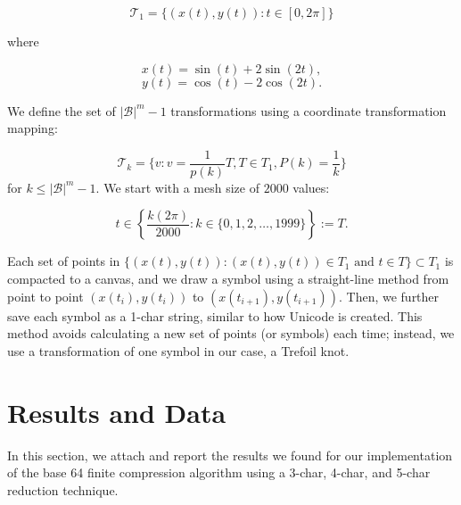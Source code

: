 \documentclass[amsmath,12pt,a4paper]{amsart}
\begin{document}
\begin{center}

\end{center}

$$
\mathcal{T}_1 = \{ (x(t), y(t)) : t \in [0, 2\pi] \}
$$

where

\[
x(t) = \sin(t) + 2 \sin(2t),
\]
\[
y(t) = \cos(t) - 2 \cos(2t).
\]

We define the set of \(|\mathcal{B}|^m - 1\) transformations using a coordinate transformation mapping:

$$
\mathcal{T}_k = \{ v : v = \frac{1}{p(k)} T, T \in T_1, P(k) = \frac{1}{k} \}
$$
for $k \leq |\mathcal{B}|^m - 1$. We start with a mesh size of $2000$ values:

$$
t \in \left\{ \frac{k(2\pi)}{2000} : k \in \{0, 1, 2, \ldots, 1999\} \right\} := T.
$$

Each set of points in \(\{(x(t), y(t)) : (x(t), y(t)) \in T_1 \text{ and } t \in T\} \subset T_1\) is compacted to a canvas, and we draw a symbol using a straight-line method from point to point \((x(t_i), y(t_i))\) to \((x(t_{i+1}), y(t_{i+1}))\). Then, we further save each symbol as a 1-char string, similar to how Unicode is created. This method avoids calculating a new set of points (or symbols) each time; instead, we use a transformation of one symbol in our case, a Trefoil knot.

\section{Results and Data}

In this section, we attach and report the results we found for our implementation of the base 64 finite compression algorithm using a 3-char, 4-char, and 5-char reduction technique.
\end{document}
